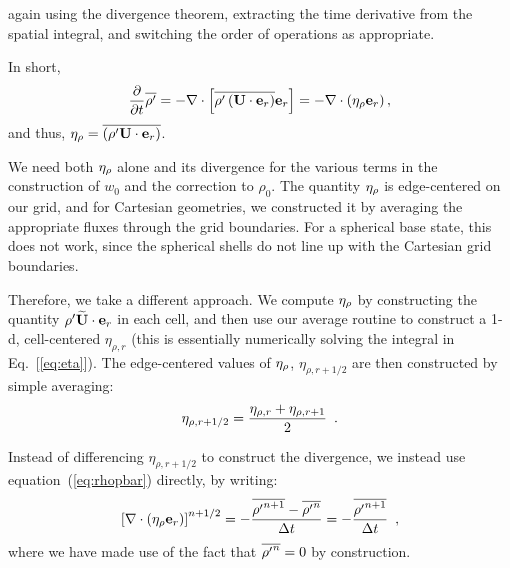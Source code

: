 again using the divergence theorem, extracting the time derivative from the spatial integral,
and switching the order of operations as appropriate.

In short, 
\begin{equation}
\frac{\partial}{\partial t} \overline{\rho'} = - \nabla\cdot\left[\overline{\rho'\left({\bf U}\cdot{\bf e}_r\right)}{\bf e}_r\right] = -\nabla\cdot\left(\eta_{\rho}{\bf e}_r\right),
\end{equation} 
and thus, $\eta_{\rho} = \overline{\left(\rho'{\bf U}\cdot{\bf e}_r\right)}$.

We need both $\eta_{\rho}$ alone and its divergence for the
various terms in the construction of $w_0$ and the correction to
$\rho_0$.  The quantity $\eta_{\rho}$ is edge-centered on our grid, and
for Cartesian geometries, we constructed it by averaging the
appropriate fluxes through the grid boundaries.  For a spherical base
state, this does not work, since the spherical shells do not line up
with the Cartesian grid boundaries.

Therefore, we take a different approach.  We compute $\eta_{\rho}$ by
constructing the quantity ${\rho^{\prime}} \widetilde{{\bf U}} \cdot \mathbf{e}_r$ in each cell, and then
use our average routine to construct a 1-d, cell-centered
$\eta_{\rho,r}$ (this is essentially numerically solving the integral
in Eq.~[\ref{eq:eta}]).  The edge-centered values of $\eta_{\rho}$,
$\eta_{\rho,r+1/2}$ are then constructed by simple
averaging: 
\begin{equation}
\eta_{\rho,r+1/2} = \frac{\eta_{\rho,r} + \eta_{\rho,r+1}}{2} \enskip .
\end{equation}

Instead of differencing $\eta_{\rho,r+1/2}$ to construct the 
divergence, we instead use equation~(\ref{eq:rhopbar}) directly, by writing:
\begin{equation}
\left [ \nabla \cdot (\eta_{\rho} \mathbf{e}_r ) \right ]^{n+1/2}
= - \frac{\overline{{\rho^{\prime}}^{n+1}} - \overline{{\rho^{\prime}}^n}}{\Delta t}
= - \frac{\overline{{\rho^{\prime}}^{n+1}}}{\Delta t} \enskip ,
\end{equation}
where we have made use of the fact that $\overline{{\rho^{\prime}}^n} = 0$ by construction.


